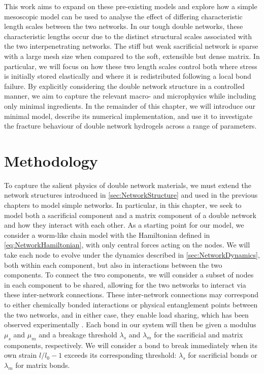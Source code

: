 This work aims to expand on these pre-existing models and explore how a simple mesoscopic model can be used to analyse the effect of differing characteristic length scales between the two networks. In our tough double networks, these characteristic lengths occur due to the distinct structural scales associated with the two interpenetrating networks. The stiff but weak sacrificial network is sparse with a large mesh size when compared to the soft, extensible but dense matrix. In particular, we will focus on how these two length scales control both where stress is initially stored elastically and where it is redistributed following a local bond failure. By explicitly considering the double network structure in a controlled manner, we aim to capture the relevant macro- and microphysics while including only minimal ingredients. In the remainder of this chapter, we will introduce our minimal model, describe its numerical implementation, and use it to investigate the fracture behaviour of double network hydrogels across a range of parameters.

\section{Methodology}
To capture the salient physics of double network materials, we must extend the network structures introduced in \cref{sec:NetworkStructure} and used in the previous chapters to model simple networks. In particular, in this chapter, we seek to model both a sacrificial component and a matrix component of a double network and how they interact with each other. As a starting point for our model, we consider a worm-like chain model with the Hamiltonian defined in \cref{eq:NetworkHamiltonian}, with only central forces acting on the nodes. We will take each node to evolve under the dynamics described in \cref{sec:NetworkDynamics}, both within each component, but also in interactions between the two components. To connect the two components, we will consider a subset of nodes in each component to be shared, allowing for the two networks to interact via these inter-network connections. These inter-network connections may correspond to either chemically bonded interactions or physical entanglement points between the two networks, and in either case, they enable load sharing, which has been observed experimentally \cite{ahmedBrittleDuctileTransition2014}. Each bond in our system will then be given a modulus $\mu_s$ and $\mu_m$ and a breakage threshold $\lambda_s$ and $\lambda_m$ for the sacrificial and matrix components, respectively. We will consider a bond to break immediately when its own strain $l/l_0 - 1$ exceeds its corresponding threshold: $\lambda_s$ for sacrificial bonds or $\lambda_m$ for matrix bonds.

